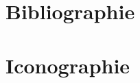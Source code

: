 \chapter*{Bibliographie}
\sloppy
\hspace*{4.2cm}
\begin{minipage}{\textwidth-4.2cm}
	\printbibliography[notkeyword=image, heading=none]
\end{minipage}



\chapter*{Iconographie}

\hspace*{4.2cm}
\begin{minipage}{\textwidth-4.2cm}
	\printbibliography[keyword=image, heading=none]
\end{minipage}



%
%
%



